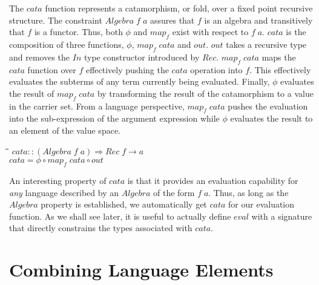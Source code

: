 \documentclass[11pt]{article}
\newlength{\lwidth}\setlength{\lwidth}{4.5cm}
\newlength{\cwidth}\setlength{\cwidth}{8mm} %
\newcommand{\Conid}[1]{\mathit{#1}}
\newcommand{\Varid}[1]{\mathit{#1}}
\begin{document}
The \ensuremath{\Varid{cata}} function represents a catamorphism, or fold, over a fixed
point recursive structure. The constraint \ensuremath{\Conid{Algebra}\;\Varid{f}\;\Varid{a}} assures that
\ensuremath{\Varid{f}} is an algebra and transitively that \ensuremath{\Varid{f}} is a functor.  Thus, both
\ensuremath{\Varid{\phi}} and \ensuremath{\Varid{map}_{f}} exist with respect to \ensuremath{\Varid{f}\;\Varid{a}}.  \ensuremath{\Varid{cata}} is the
composition of three functions, \ensuremath{\Varid{\phi}}, \ensuremath{\Varid{map}_{f}\;\Varid{cata}} and \ensuremath{\Varid{out}}.  \ensuremath{\Varid{out}}
takes a recursive type and removes the \ensuremath{\Conid{In}} type constructor
introduced by \ensuremath{\Conid{Rec}}.  \ensuremath{\Varid{map}_{f}\;\Varid{cata}} maps the \ensuremath{\Varid{cata}} function over \ensuremath{\Varid{f}}
effectively pushing the \ensuremath{\Varid{cata}} operation into \ensuremath{\Varid{f}}.  This effectively
evaluates the subterms of any term currently being evaluated.
Finally, \ensuremath{\Varid{\phi}} evaluates the result of \ensuremath{\Varid{map}_{f}\;\Varid{cata}} by transforming the
result of the catamorphism to a value in the carrier set. From a
language perspective, \ensuremath{\Varid{map}_{f}\;\Varid{cata}} pushes the evaluation into the
sub-expression of the argument expression while \ensuremath{\Varid{\phi}} evaluates the
result to an element of the value space.

\begin{tabbing}
\qquad\=\hspace{\lwidth}\=\hspace{\cwidth}\=\+\kill
${\Varid{cata}\mathbin{::}(\Conid{Algebra}\;\Varid{f}\;\Varid{a})\Rightarrow \Conid{Rec}\;\Varid{f}\to \Varid{a}}$\\
${\Varid{cata}\mathrel{=}\Varid{\phi}\mathbin{\circ}\Varid{map}_{f}\;\Varid{cata}\mathbin{\circ}\Varid{out}}$
\end{tabbing}
An interesting property of \ensuremath{\Varid{cata}} is that it provides an evaluation
capability for \emph{any} language described by an \ensuremath{\Conid{Algebra}} of the
form \ensuremath{\Varid{f}\;\Varid{a}}.  Thus, as long as the \ensuremath{\Conid{Algebra}} property is established,
we automatically get \ensuremath{\Varid{cata}} for our evaluation function.  As we shall
see later, it is useful to actually define \ensuremath{\Varid{eval}} with a signature
that directly constrains the types associated with \ensuremath{\Varid{cata}}.

\section{Combining Language Elements}
\end{document}
